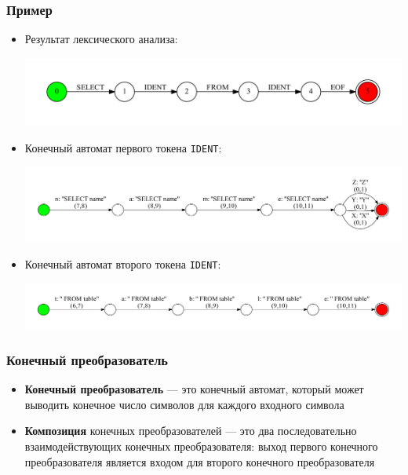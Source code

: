 \documentclass{beamer}
\begin{document}
\begin{frame}[fragile]
\transwipe[direction=90]
\frametitle{Пример}
\begin{itemize}
\item Результат лексического анализа:
	\begin{center}
        {\includegraphics[width=1.0\linewidth]{tsql_test_appr}}
    \end{center}
		
\item Конечный автомат первого токена \verb|IDENT|:
	\begin{center}
        {\includegraphics[width=1.0\linewidth]{tsql_ident_1}}
    \end{center}

\item Конечный автомат второго токена \verb|IDENT|:
	\begin{center}
        {\includegraphics[width=1.0\linewidth]{tsql_ident_2}}
    \end{center}
\end{itemize}
\end{frame}


\begin{frame}[fragile]
\transwipe[direction=90]
\frametitle{Конечный преобразователь}
\begin{itemize}
\item \textbf{Конечный преобразователь} --- это конечный автомат, который может выводить конечное число символов для каждого входного символа

\item \textbf{Композиция} конечных преобразователей --- это два последовательно взаимодействующих конечных преобразователя: выход первого конечного преобразователя является входом для второго конечного преобразователя
\end{itemize}
\end{frame}
\end{document}
